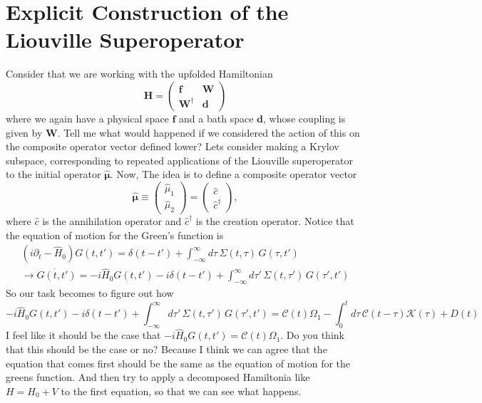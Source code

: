 \section{Explicit Construction of the Liouville Superoperator}
Consider that we are working with the upfolded Hamiltonian
\begin{equation}
    \textbf{H} = \begin{pmatrix}
        \textbf{f} & \textbf{W} \\
        \textbf{W}^{\dagger} & \textbf{d}
    \end{pmatrix}
\end{equation}
where we again have a physical space $\textbf{f}$ and a bath space $\textbf{d}$,  whose coupling is given by $\textbf{W}$. Tell me what would happened if we considered the action of this on the composite operator vector defined lower?
Lets consider making a Krylov subspace, corresponding to repeated applications of the Liouville superoperator to the initial operator $\hat{\boldsymbol{\mu}}$.
 Now, The idea is to define a composite operator vector
\begin{equation}
\hat{\boldsymbol{\mu}} \equiv
\begin{pmatrix}
\hat{\mu}_1 \\
\hat{\mu}_2
\end{pmatrix} = \begin{pmatrix}
\hat{c} \\
\hat{c}^{\dagger}
\end{pmatrix},
\end{equation}
where \( \hat{c} \) is the annihilation operator and \( \hat{c}^{\dagger} \) is the creation operator. Notice that the equation of motion for the Green's function is
\begin{align}
(i \partial_t - \hat{H}_0) G(t,t') = \delta(t-t') 
+ \int_{-\infty}^{\infty} d\tau \, \Sigma(t,\tau) \, G(\tau,t')\\ \rightarrow \dot{G(t,t')} = -i \hat{H}_0 G(t,t') -i\delta(t-t') + \int_{-\infty}^{\infty} d\tau' \, \Sigma(t,\tau') \, G(\tau',t')
\end{align}
So our task becomes to figure out how 
\begin{equation}
    -i \hat{H}_0 G(t,t') -i\delta(t-t') + \int_{-\infty}^{\infty} d\tau' \, \Sigma(t,\tau') \, G(\tau',t') = \mathcal{C}(t) {\Omega_1} - \int_{0}^{t} d \tau\, \mathcal{C}(t - \tau) \mathcal{K}(\tau) + D(t)
\end{equation}
I feel like it should be the case that $-i \hat{H}_0 G(t,t')= \mathcal{C}(t) {\Omega_1}$. Do you think that this should be the case or no? Because I think we can agree that the equation that comes first should be the same as the equation of motion for the greens function. And then try to apply a decomposed Hamiltonia like $H=H_0+V$ to the first equation, so that we can see what happens.



